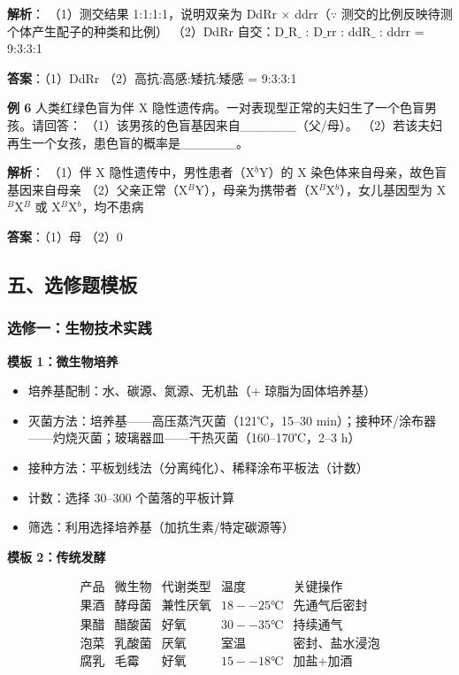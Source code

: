 \textbf{解析}：
（1）测交结果 1:1:1:1，说明双亲为 DdRr $\times$ ddrr（$\because$ 测交的比例反映待测个体产生配子的种类和比例）
（2）DdRr 自交：D$\_$R$\_$ : D$\_$rr : ddR$\_$ : ddrr = 9:3:3:1

\textbf{答案}：（1）DdRr （2）高抗:高感:矮抗:矮感 = 9:3:3:1

\textbf{例 6} 人类红绿色盲为伴 X 隐性遗传病。一对表现型正常的夫妇生了一个色盲男孩。请回答：
（1）该男孩的色盲基因来自\_\_\_\_\_\_（父/母）。
（2）若该夫妇再生一个女孩，患色盲的概率是\_\_\_\_\_\_。

\textbf{解析}：
（1）伴 X 隐性遗传中，男性患者（X$^b$Y）的 X 染色体来自母亲，故色盲基因来自母亲
（2）父亲正常（X$^B$Y），母亲为携带者（X$^B$X$^b$），女儿基因型为 X$^B$X$^B$ 或 X$^B$X$^b$，均不患病

\textbf{答案}：（1）母 （2）0

\subsection{五、选修题模板}

\subsubsection{选修一：生物技术实践}

\textbf{模板 1：微生物培养}

\begin{itemize}
  \item 培养基配制：水、碳源、氮源、无机盐（+ 琼脂为固体培养基）
  \item 灭菌方法：培养基——高压蒸汽灭菌（121℃，15--30 min）；接种环/涂布器——灼烧灭菌；玻璃器皿——干热灭菌（160--170℃，2--3 h）
  \item 接种方法：平板划线法（分离纯化）、稀释涂布平板法（计数）
  \item 计数：选择 30--300 个菌落的平板计算
  \item 筛选：利用选择培养基（加抗生素/特定碳源等）
\end{itemize}

\textbf{模板 2：传统发酵}

\[
\begin{array}{c|c|c|c|c}
\text{产品} & \text{微生物} & \text{代谢类型} & \text{温度} & \text{关键操作} \\ \hline
\text{果酒} & \text{酵母菌} & \text{兼性厌氧} & 18--25℃ & \text{先通气后密封} \\
\text{果醋} & \text{醋酸菌} & \text{好氧} & 30--35℃ & \text{持续通气} \\
\text{泡菜} & \text{乳酸菌} & \text{厌氧} & \text{室温} & \text{密封、盐水浸泡} \\
\text{腐乳} & \text{毛霉} & \text{好氧} & 15--18℃ & \text{加盐+加酒}
\end{array}
\]

